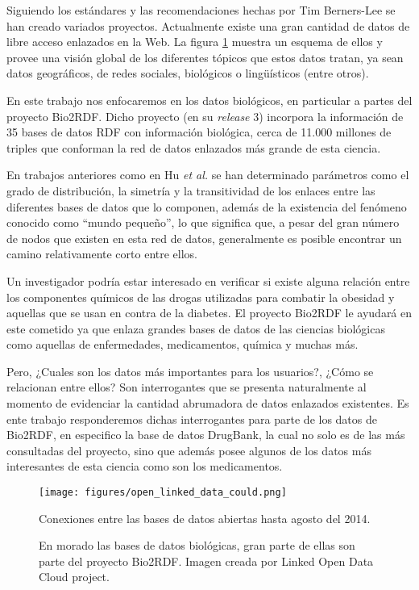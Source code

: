Siguiendo los estándares y las recomendaciones hechas por Tim Berners-Lee se han
creado variados proyectos.
Actualmente existe una gran cantidad de datos de libre acceso enlazados en la
Web. La figura \ref{fig:cloud} muestra un esquema de ellos y provee una visión
global de los diferentes tópicos que estos datos tratan, ya sean datos
geográficos, de redes sociales, biológicos o lingüísticos (entre otros).

En este trabajo nos enfocaremos en los datos biológicos, en particular a partes
del proyecto Bio2RDF.
Dicho proyecto (en su \emph{release} 3) incorpora la información de 35 bases de
datos RDF con información biológica, cerca de 11.000 millones de triples que
conforman la red de datos enlazados más grande de esta ciencia.

En trabajos anteriores como en Hu \emph{et al.}\cite{hu2015link} se han
determinado parámetros como el grado de distribución, la simetría y la
transitividad de los enlaces entre las diferentes bases de datos que lo
componen, además de la existencia del fenómeno conocido como ``mundo pequeño'',
lo que significa que, a pesar del gran número de nodos que existen en esta red
de datos, generalmente es posible encontrar un camino relativamente corto entre
ellos.

Un investigador podría estar interesado en verificar si existe alguna relación
entre los componentes químicos de las drogas utilizadas para combatir la
obesidad y aquellas que se usan en contra de la diabetes.
El proyecto Bio2RDF le ayudará en este cometido ya que enlaza grandes bases de
datos de las ciencias biológicas como aquellas de enfermedades, medicamentos,
química y muchas más.

Pero, ¿Cuales son los datos más importantes para los usuarios?, ¿Cómo se
relacionan entre ellos? Son interrogantes que se presenta naturalmente al
momento de evidenciar la cantidad abrumadora de datos enlazados existentes.
Es ente trabajo responderemos dichas interrogantes para parte de los datos de
Bio2RDF, en especifico la base de datos DrugBank, la cual no solo es de las más
consultadas del proyecto, sino que además posee algunos de los datos más
interesantes de esta ciencia como son los medicamentos.

\begin{figure}[ht]
  \centering
  \texttt{[image: figures/open\_linked\_data\_could.png]}
  \caption{Conexiones entre las bases de datos abiertas hasta agosto del 2014.}
  \vspace{-.2cm}
  \caption*{
    En morado las bases de datos biológicas, gran parte de ellas son parte del
    proyecto Bio2RDF.
    Imagen creada por Linked Open Data Cloud project\cite{lod:cloud}.}
  \label{fig:cloud}
\end{figure}
~\vspace{-1cm}

